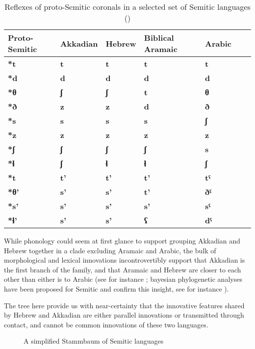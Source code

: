 \documentclass[svgnames,12pt]{scrartcl}
\newcommand{\ipa}[1]{\textbf{{\phon\mbox{#1}}}}
\newcommand{\grise}[1]{\cellcolor{lightgray}\textbf{#1}}
\begin{document}
\begin{table}[h]
\caption{Reflexes of proto-Semitic coronals in a selected set of Semitic languages (\citealt{huehnergard97})} \label{tab:protosem} \centering
\begin{tabular}{lllllll}
\toprule
Proto-Semitic & Akkadian & Hebrew & Biblical Aramaic & Arabic \\
\midrule
\ipa{*t} & \ipa{t} & \ipa{t} & \ipa{t} & \ipa{t} \\
\ipa{*d} & \ipa{d} & \ipa{d} & \ipa{d} & \ipa{d} \\
\ipa{*θ} & \ipa{ʃ} \grise{}& \ipa{ʃ} \grise{}& \ipa{t} & \ipa{θ} \\
\ipa{*ð} & \ipa{z} \grise{}& \ipa{z} \grise{}& \ipa{d} & \ipa{ð} \\
\ipa{*s} & \ipa{s} & \ipa{s} & \ipa{s} & \ipa{ʃ} &\\
\ipa{*z} & \ipa{z} & \ipa{z} & \ipa{z} & \ipa{z} \\
\ipa{*ʃ} & \ipa{ʃ} & \ipa{ʃ} & \ipa{ʃ} & \ipa{s} &\\
\ipa{*ɬ} & \ipa{ʃ} \grise{}& \ipa{ɬ} & \ipa{ɬ} &  \ipa{ʃ} \grise{}\\
\ipa{*t} & \ipa{t'} & \ipa{t'} & \ipa{t'} & \ipa{tˤ} \\
\ipa{*θ'} & \ipa{s'} \grise{}& \ipa{s'} \grise{}& \ipa{t'} & \ipa{ðˤ} \\
\ipa{*s'} & \ipa{s'}  & \ipa{s'} & \ipa{s'} & \ipa{sˤ} &\\
\ipa{*ɬ'} & \ipa{s'} \grise{}& \ipa{s'} \grise{}& \ipa{ʕ} &  \ipa{dˤ} \\
\bottomrule
\end{tabular}
\end{table}

While phonology could seem at first glance to support grouping Akkadian and Hebrew together in a clade excluding Aramaic and Arabic, the bulk of morphological and lexical innovations incontrovertibly support that Akkadian is the first branch of the family, and that Aramaic and Hebrew are closer to each other than either is to Arabic  (see for instance \citealt{hetzron76two}; bayesian phylogenetic analyses have been proposed for Semitic and confirm this insight, see for instance \citealt{nicholls11semitic}). 

The tree here provide us with near-certainty that the innovative features shared by Hebrew and Akkadian are either parallel innovations or transmitted through contact, and cannot be common innovations of these two languages.

   \begin{figure}[h]
   \caption{A simplified Stammbaum of Semitic languages} \label{fig:semitic}   \centering
\end{figure}
\end{document}
